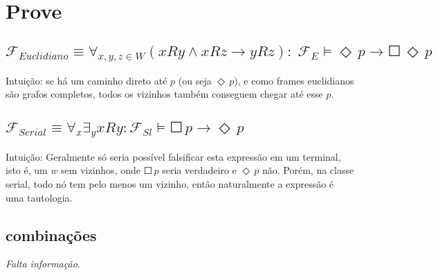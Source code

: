 \documentclass[11pt]{article}
\newcommand{\sq}{\Square \,}
\newcommand{\di}{\Diamond \,}
\newcommand{\imp}{\rightarrow}
\newcommand{\F}{\mathcal{F}}
\begin{document}
\section{Prove}

\subsection{$\F_{Euclidiano} \equiv \forall_{x,y,z \in W} ( xRy \land xRz \imp yRz ): \; 
\F_E \models \di p \imp \sq\di p
$}

Intuição: se há um caminho direto até $p$ (ou seja $\di p$), e como frames euclidianos são grafos completos, todos os vizinhos também conseguem chegar até esse $p$.

\subsection{$ \F_{Serial} \equiv \forall_x\exists_y xRy: 
\F_{Sl} \models \sq p \imp \di p
$}

Intuição: Geralmente só seria possível falsificar esta expressão em um terminal, isto é, um $w$ sem vizinhos, onde $\sq p$ seria verdadeiro e $\di p$ não. Porém, na classe serial, todo nó tem pelo menos um vizinho, então naturalmente a expressão é uma tautologia.

\subsection{combinações}
\emph{Falta informação.}
\end{document}
